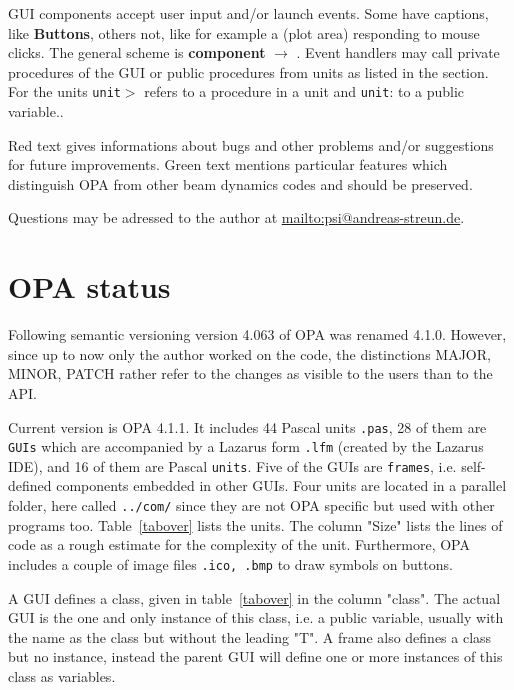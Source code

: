 \documentclass[12pt]{article}
\newcommand\code[1]{{\tt #1}}
\newcommand{\ofld}[1]{\colorbox{black!15}{{\bf #1}}}
\newcommand{\ofldx}[1]{\colorbox{black!15}{(#1)}}
\newcommand\guico[1]{{\color{blue}\code{#1}}}
\newcommand{\unico}[1]{{\color{burntorange}\code{#1}}}
\newcommand{\evcod}[2]{\ofld{#1} $\rightarrow$ \guico{#2}}
\newcommand{\prcod}[2]{\opauni{#1}$>$\unico{#2}}
\newcommand{\vrcod}[2]{\opauni{#1}:\unico{#2}}
\newcommand{\opagui}[1]{\colorbox{blue!20}{\code{#1}}}
\newcommand{\opaguif}[1]{\colorbox{violet!30}{\code{#1}}}
\newcommand{\opauni}[1]{\colorbox{orange!30}{\code{#1}}}
\newcommand{\todo}[1]{{\color{red} #1}}
\newcommand{\feature}[1]{{\color{cadmiumgreen} #1}}
\begin{document}
GUI components accept user input and/or launch events. Some have captions, like \ofld{Buttons}, others not, like for example a \ofldx{plot area} responding to mouse clicks. The general scheme is \evcod{component}{event handler}. Event handlers may call private procedures of the GUI or public procedures from units as listed in the \guico{uses} section. For the units \prcod{unit}{procedure} refers to a procedure in a unit and \vrcod{unit}{variable} to a public variable..

\todo{Red text gives informations about bugs and other problems and/or suggestions for future improvements.} \feature{Green text mentions particular features which distinguish OPA from other beam dynamics codes and should be preserved.}

Questions may be adressed to the author at \url{mailto:psi@andreas-streun.de}.

\newpage


\section{OPA status}

Following semantic versioning \cite{semver} version 4.063 of OPA was renamed 4.1.0. However, since up to now only the author worked on the code, the distinctions MAJOR, MINOR, PATCH rather refer to the changes as visible to the users than to the API. 


Current version is OPA 4.1.1. It includes 44 Pascal units \code{.pas}, 28 of them are \opagui{GUIs} which are accompanied by a Lazarus form \code{.lfm} (created by the Lazarus IDE), and 16 of them are Pascal \opauni{units}. Five of the GUIs are \opaguif{frames}, i.e. self-defined components embedded in other GUIs. Four units are located in a parallel folder, here called \code{../com/} since they are not OPA specific but used with other programs too.
Table~\ref{tabover} lists the units. The column "Size" lists the lines of code as a rough estimate for the complexity of the unit. Furthermore, OPA includes a couple of image files \code{.ico, .bmp} to draw symbols on buttons. 

A GUI defines a class, given in table~\ref{tabover} in the column "class". The actual GUI is the one and only instance of this class, i.e. a public variable, usually with the name as the class but without the leading "T". A frame also defines a class but no instance, instead the parent GUI will define one or more instances of this class as variables.
\end{document}
